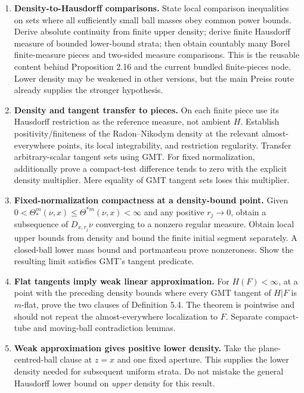 \begin{enumerate}
\item \textbf{Density-to-Hausdorff comparisons.}
State local comparison inequalities on sets where all sufficiently small
ball masses obey common power bounds. Derive absolute continuity from finite
upper density; derive finite Hausdorff measure of bounded lower-bound strata;
then obtain countably many Borel finite-measure pieces and two-sided measure
comparisons. This is the reusable content behind Proposition 2.16 and the
current bundled finite-pieces node. Lower density may be weakened in other
versions, but the main Preiss route already supplies the stronger hypothesis.

\item \textbf{Density and tangent transfer to pieces.}
On each finite piece use its Hausdorff restriction as the reference measure,
not ambient $H$. Establish positivity/finiteness of the Radon--Nikodym density
at the relevant almost-everywhere points, its local integrability, and
restriction regularity. Transfer arbitrary-scalar tangent sets using GMT.
For fixed normalization, additionally prove a compact-test difference tends
to zero with the explicit density multiplier. Mere equality of GMT tangent
sets loses this multiplier.

\item \textbf{Fixed-normalization compactness at a density-bound point.}
Given $0<\Theta_*^m(\nu,x)\leq\Theta^{*m}(\nu,x)<\infty$ and any positive
$r_j\to0$, obtain a subsequence of $D_{x,r_j}\nu$ converging to a nonzero
regular measure. Obtain local upper bounds from density and bound the finite
initial segment separately. A closed-ball lower mass bound and portmanteau
prove nonzeroness. Show the resulting limit satisfies GMT's tangent predicate.

\item \textbf{Flat tangents imply weak linear approximation.}
For $H(F)<\infty$, at a point with the preceding density bounds where every
GMT tangent of $H|F$ is $m$-flat, prove the two clauses of Definition 5.4.
The theorem is pointwise and should not repeat the almost-everywhere
localization to $F$. Separate compact-tube and moving-ball contradiction lemmas.

\item \textbf{Weak approximation gives positive lower density.}
Take the plane-centred-ball clause at $z=x$ and one fixed aperture. This
supplies the lower density needed for subsequent uniform strata. Do not
mistake the general Hausdorff lower bound on \emph{upper} density for this result.


\end{enumerate}
